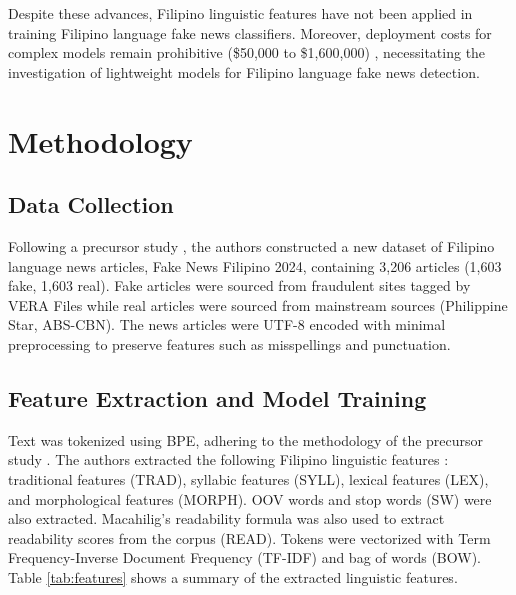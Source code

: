 \documentclass[conference]{IEEEtran}
\begin{document}
Despite these advances, Filipino linguistic features have not been applied in training Filipino language fake news classifiers. Moreover, deployment costs for complex models remain prohibitive (\$50,000 to \$1,600,000) \cite{b4}, necessitating the investigation of lightweight models for Filipino language fake news detection.

\section{Methodology}

\subsection{Data Collection}
Following a precursor study \cite{b3}, the authors constructed a new dataset of Filipino language news articles, Fake News Filipino 2024, containing 3,206 articles (1,603 fake, 1,603 real). Fake articles were sourced from fraudulent sites tagged by VERA Files while real articles were sourced from mainstream sources (Philippine Star, ABS-CBN). The news articles were UTF-8 encoded with minimal preprocessing to preserve features such as misspellings and punctuation.

\subsection{Feature Extraction and Model Training}
Text was tokenized using BPE, adhering to the methodology of the precursor study \cite{b3}. The authors extracted the following Filipino linguistic features \cite{b8,b9,b10}: traditional features (TRAD), syllabic features (SYLL), lexical features (LEX), and morphological features (MORPH). OOV words and stop words (SW) were also extracted. Macahilig's readability formula \cite{b10} was also used to extract readability scores from the corpus (READ). Tokens were vectorized with Term Frequency-Inverse Document Frequency (TF-IDF) and bag of words (BOW). Table \ref{tab:features} shows a summary of the extracted linguistic features.
\end{document}
